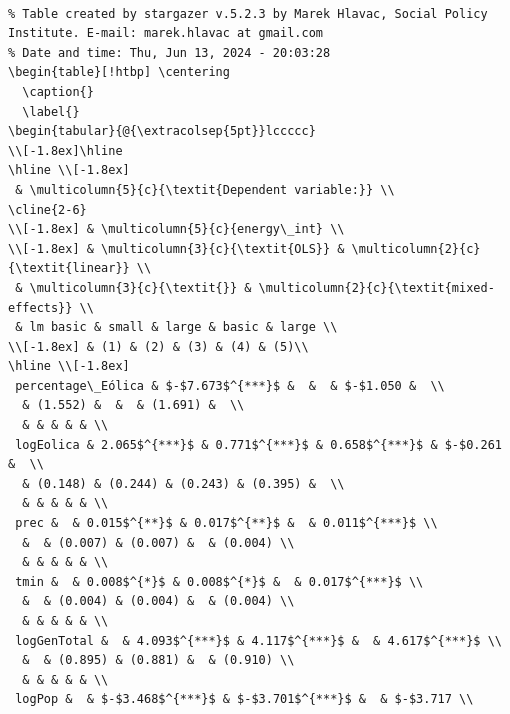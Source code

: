 \documentclass[
]{report}
\begin{document}
\begin{verbatim}

% Table created by stargazer v.5.2.3 by Marek Hlavac, Social Policy Institute. E-mail: marek.hlavac at gmail.com
% Date and time: Thu, Jun 13, 2024 - 20:03:28
\begin{table}[!htbp] \centering 
  \caption{} 
  \label{} 
\begin{tabular}{@{\extracolsep{5pt}}lccccc} 
\\[-1.8ex]\hline 
\hline \\[-1.8ex] 
 & \multicolumn{5}{c}{\textit{Dependent variable:}} \\ 
\cline{2-6} 
\\[-1.8ex] & \multicolumn{5}{c}{energy\_int} \\ 
\\[-1.8ex] & \multicolumn{3}{c}{\textit{OLS}} & \multicolumn{2}{c}{\textit{linear}} \\ 
 & \multicolumn{3}{c}{\textit{}} & \multicolumn{2}{c}{\textit{mixed-effects}} \\ 
 & lm basic & small & large & basic & large \\ 
\\[-1.8ex] & (1) & (2) & (3) & (4) & (5)\\ 
\hline \\[-1.8ex] 
 percentage\_Eólica & $-$7.673$^{***}$ &  &  & $-$1.050 &  \\ 
  & (1.552) &  &  & (1.691) &  \\ 
  & & & & & \\ 
 logEolica & 2.065$^{***}$ & 0.771$^{***}$ & 0.658$^{***}$ & $-$0.261 &  \\ 
  & (0.148) & (0.244) & (0.243) & (0.395) &  \\ 
  & & & & & \\ 
 prec &  & 0.015$^{**}$ & 0.017$^{**}$ &  & 0.011$^{***}$ \\ 
  &  & (0.007) & (0.007) &  & (0.004) \\ 
  & & & & & \\ 
 tmin &  & 0.008$^{*}$ & 0.008$^{*}$ &  & 0.017$^{***}$ \\ 
  &  & (0.004) & (0.004) &  & (0.004) \\ 
  & & & & & \\ 
 logGenTotal &  & 4.093$^{***}$ & 4.117$^{***}$ &  & 4.617$^{***}$ \\ 
  &  & (0.895) & (0.881) &  & (0.910) \\ 
  & & & & & \\ 
 logPop &  & $-$3.468$^{***}$ & $-$3.701$^{***}$ &  & $-$3.717 \\ 

\end{verbatim}
\end{document}
